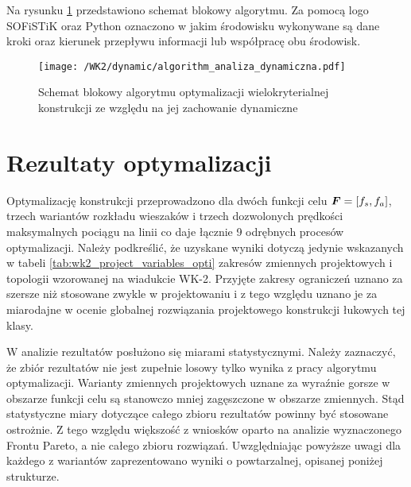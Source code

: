 Na rysunku \ref{fig:wk2_dynamic_algorithm} przedstawiono schemat blokowy algorytmu. Za pomocą logo SOFiSTiK oraz Python oznaczono w jakim środowisku wykonywane są dane kroki oraz kierunek przepływu informacji lub współpracę obu środowisk.
\begin{figure}[p]
	\centering
	\texttt{[image: /WK2/dynamic/algorithm\_analiza\_dynamiczna.pdf]} 
	\captionsetup{justification=centering}
	\caption{Schemat blokowy algorytmu optymalizacji wielokryterialnej konstrukcji ze względu na jej zachowanie dynamiczne}
	\label{fig:wk2_dynamic_algorithm}
\end{figure}

\section{Rezultaty optymalizacji}

Optymalizację konstrukcji przeprowadzono dla dwóch funkcji celu $\bm{F}=[f_s,f_a]$, trzech wariantów rozkładu wieszaków i trzech dozwolonych prędkości maksymalnych pociągu na linii co daje łącznie 9 odrębnych procesów optymalizacji. Należy podkreślić, że uzyskane wyniki dotyczą jedynie wskazanych w tabeli \ref{tab:wk2_project_variables_opti} zakresów zmiennych projektowych i topologii wzorowanej na wiadukcie WK-2. Przyjęte zakresy ograniczeń uznano za szersze niż stosowane zwykle w projektowaniu i z tego względu uznano je za miarodajne w ocenie globalnej rozwiązania projektowego konstrukcji łukowych tej klasy. 

W analizie rezultatów posłużono się miarami statystycznymi. Należy zaznaczyć, że zbiór rezultatów nie jest zupełnie losowy tylko wynika z pracy algorytmu optymalizacji. Warianty zmiennych projektowych uznane za wyraźnie gorsze w obszarze funkcji celu są stanowczo mniej zagęszczone w obszarze zmiennych. Stąd statystyczne miary dotyczące całego zbioru rezultatów powinny być stosowane ostrożnie. Z tego względu większość z wniosków oparto na analizie wyznaczonego Frontu Pareto, a nie całego zbioru rozwiązań. Uwzględniając powyższe uwagi dla każdego z wariantów zaprezentowano wyniki o powtarzalnej, opisanej poniżej strukturze.

